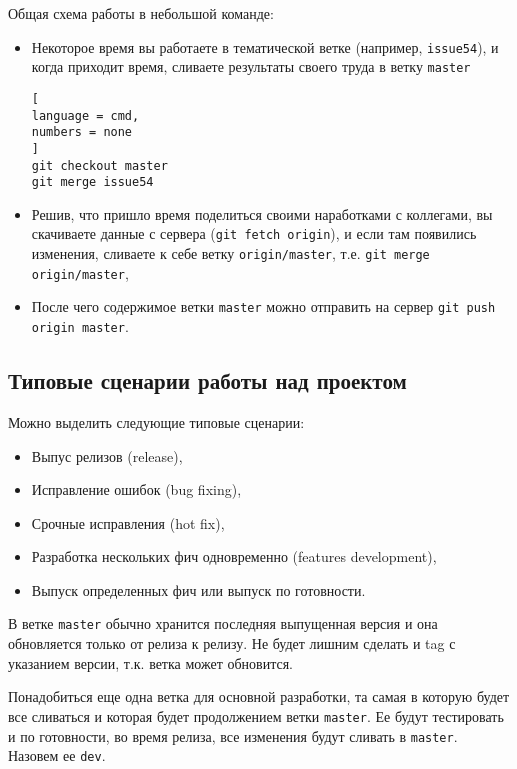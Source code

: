 \documentclass[%
	11pt,
	a4paper,
	utf8,
		]{article}
\begin{document}
Общая схема работы в небольшой команде:
\begin{itemize}
	\item Некоторое время вы работаете в тематической ветке (например, \texttt{issue54}), и когда приходит время, сливаете результаты своего труда в ветку \texttt{master}
	
\begin{lstlisting}[
language = cmd,
numbers = none
]
git checkout master
git merge issue54
\end{lstlisting}
	
	\item Решив, что пришло время поделиться своими наработками с коллегами, вы скачиваете данные с сервера (\texttt{git fetch origin}), и если там появились изменения, сливаете к себе ветку \texttt{origin/master}, т.е. \texttt{git merge origin/master},
	
	\item После чего содержимое ветки \texttt{master} можно отправить на сервер \texttt{git push origin master}.
\end{itemize}

\subsection{Типовые сценарии работы над проектом}

Можно выделить следующие типовые сценарии:
\begin{itemize}
	\item Выпус релизов (release),
	
	\item Исправление ошибок (bug fixing),
	
	\item Срочные исправления (hot fix),
	
	\item Разработка нескольких фич одновременно (features development),
	
	\item Выпуск определенных фич или выпуск по готовности.
\end{itemize}

В ветке \texttt{master} обычно хранится последняя выпущенная версия и она обновляется только от релиза к релизу. Не будет лишним сделать и tag с указанием версии, т.к. ветка может обновится.

Понадобиться еще одна ветка для основной разработки, та самая в которую будет все сливаться и которая будет продолжением ветки \texttt{master}. Ее будут тестировать и по готовности, во время релиза, все изменения будут сливать в \texttt{master}. Назовем ее \texttt{dev}.
\end{document}
